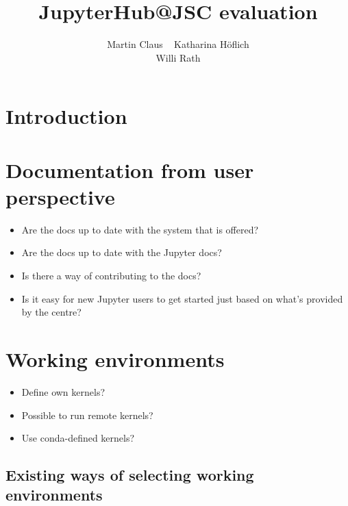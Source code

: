 \documentclass[11pt,a4paper]{article}
\title{\textbf{JupyterHub@JSC evaluation}}
\author{
  Martin Claus \ %
	Katharina Höflich \\
	Willi Rath}
\begin{document}
\maketitle


%

\section{Introduction}
\label{s-introductoin}


\section{Documentation from user perspective}
\label{s-doc-from-user-pov}

\begin{itemize}
	\item Are the docs up to date with the system that is offered?
	\item Are the docs up to date with the Jupyter docs?
	\item Is there a way of contributing to the docs?
	\item Is it easy for new Jupyter users to get started just based on what's provided by the centre?
\end{itemize}


\section{Working environments}
\label{s-working-envs}

\begin{itemize}
  \item Define own kernels?
  \item Possible to run remote kernels?
  \item Use conda-defined kernels?
\end{itemize}

\subsection{Existing ways of selecting working environments}
\label{ss-existing-env-selection}
\end{document}
